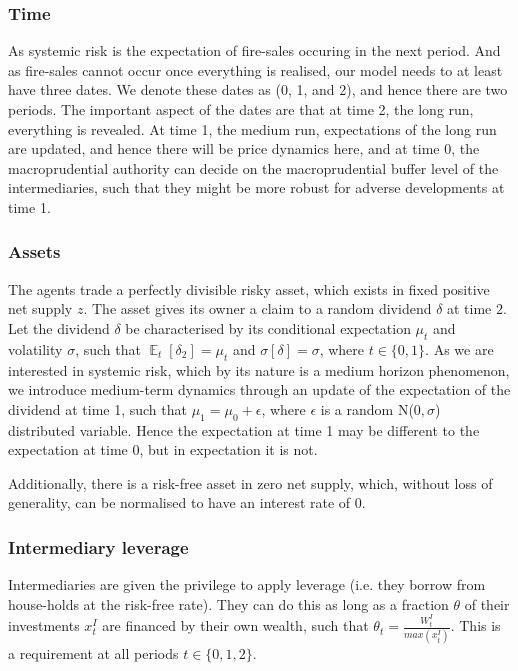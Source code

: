 \documentclass[11pt]{article}
\DeclareMathOperator{\E}{\mathbb{E}} %
\begin{document}
\subsubsection*{Time}
As systemic risk is the expectation of fire-sales occuring in the next period. And as fire-sales cannot occur once everything is realised, our model needs to at least have three dates. We denote these dates as (0, 1, and 2), and hence there are two periods. The important aspect of the dates are that at time 2, the long run, everything is revealed. At time 1, the medium run, expectations of the long run are updated, and hence there will be price dynamics here, and at time 0, the macroprudential authority can decide on the macroprudential buffer level of the intermediaries, such that they might be more robust for adverse developments at time 1.


\subsubsection*{Assets}

The agents trade a perfectly divisible risky asset, which exists in fixed positive net supply $z$. The asset gives its owner a claim to a random dividend $\delta$ at time $2$. Let the dividend $\delta$ be characterised by its conditional expectation $\mu_t$ and volatility $\sigma$, such that $\E_t[\delta_2] = \mu_t$ and $\sigma[\delta] = \sigma$, where $t\in\{0,1\}$. As we are interested in systemic risk, which by its nature is a medium horizon phenomenon, we introduce medium-term dynamics through an update of the expectation of the dividend at time 1, such that $\mu_1 = \mu_0 + \epsilon$, where $\epsilon$ is a random N($0,\sigma$) distributed variable. Hence the expectation at time 1 may be different to the expectation at time 0, but in expectation it is not.

Additionally, there is a risk-free asset in zero net supply, which, without loss of generality, can be normalised to have an interest rate of 0.

\subsubsection*{Intermediary leverage}
Intermediaries are given the privilege to apply leverage (i.e. they borrow from house-holds at the risk-free rate). They can do this as long as a fraction $\theta$ of their investments $x^I_t$ are financed by their own wealth, such that $\theta_t = \frac{W^I_t}{max(x^{I}_t)}$. This is a requirement at all periods $t\in \{0,1,2\}$. 
\end{document}
